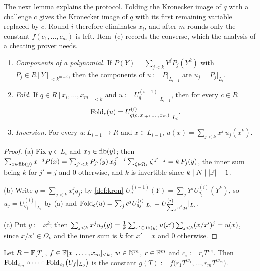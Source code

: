 The next lemma explains the protocol. Folding the Kronecker image of $q$ with a challenge $c$
gives the Kronecker image of $q$ with its first remaining variable replaced by $c$. Round $i$
therefore eliminates $x_i$, and after $m$ rounds only the constant $f(c_1,\dots,c_m)$ is left.
Item~(c) records the converse, which the analysis of a cheating prover needs.

\begin{lemma}\label{lem:fold-sub}
\leavevmode
\begin{enumerate}
\item[(a)] \emph{Components of a polynomial.} If $P(Y)=\sum_{j<k}Y^jP_j(Y^k)$ with
$P_j\in R[Y]_{<k^{m-i}}$, then the components of $u:=P|_{L_{i-1}}$ are $u_j=P_j|_{L_i}$.
\item[(b)] \emph{Fold.} If $q\in R[x_i,\dots,x_m]_{<k}$ and $u:=U^{(i-1)}_q|_{L_{i-1}}$, then for
every $c\in R$
\[
\mathrm{Fold}_c(u)=U^{(i)}_{q(c,\,x_{i+1},\dots,x_m)}\Big|_{L_i}.
\]
\item[(c)] \emph{Inversion.} For every $u:L_{i-1}\to R$ and $x\in L_{i-1}$,
$u(x)=\sum_{j<k}x^j\,u_j(x^k)$.
\end{enumerate}
\end{lemma}

\begin{proof}
(a) Fix $y\in L_i$ and $x_0\in\mathrm{fib}(y)$; then
$\sum_{x\in\mathrm{fib}(y)}x^{-j}P(x)=\sum_{j'<k}P_{j'}(y)\,x_0^{\,j'-j}\sum_{\zeta\in\Omega_k}\zeta^{\,j'-j}=k\,P_j(y)$,
the inner sum being $k$ for $j'=j$ and $0$ otherwise, and $k$ is invertible since
$k\mid N\mid|\mathbb{F}|-1$.

(b) Write $q=\sum_{j<k}x_i^jq_j$; by \cref{def:kron} $U^{(i-1)}_q(Y)=\sum_jY^jU^{(i)}_{q_j}(Y^k)$,
so $u_j=U^{(i)}_{q_j}|_{L_i}$ by (a) and
$\mathrm{Fold}_c(u)=\sum_jc^jU^{(i)}_{q_j}|_{L_i}=U^{(i)}_{\sum_jc^jq_j}|_{L_i}$.

(c) Put $y:=x^k$; then
$\sum_{j<k}x^ju_j(y)=\frac1k\sum_{x'\in\mathrm{fib}(y)}u(x')\sum_{j<k}(x/x')^j=u(x)$, since
$x/x'\in\Omega_k$ and the inner sum is $k$ for $x'=x$ and $0$ otherwise.
\end{proof}

\begin{corollary}\label{cor:terminal}
Let $R=\mathbb{F}[T]$, $f\in\mathbb{F}[x_1,\dots,x_m]_{<k}$, $w\in\mathbb{N}^m$, $r\in\mathbb{F}^m$ and $c_i:=r_iT^{w_i}$. Then
$\mathrm{Fold}_{c_m}\circ\cdots\circ\mathrm{Fold}_{c_1}\big(U_f|_{L_0}\big)$ is the constant
$g(T):=f\big(r_1T^{w_1},\dots,r_mT^{w_m}\big)$.
\end{corollary}

